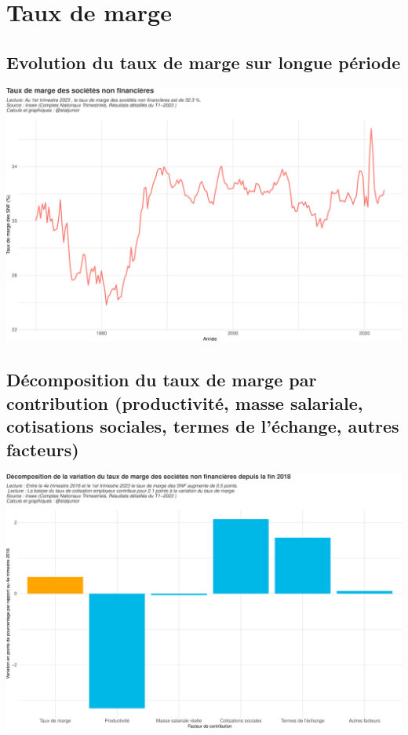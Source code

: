 \documentclass[
  paper=a4,
  ,captions=tableheading
]{scrartcl}
\begin{document}
\newpage

\hypertarget{taux-de-marge}{%
\section{Taux de marge}\label{taux-de-marge}}

\hypertarget{evolution-du-taux-de-marge-sur-longue-puxe9riode}{%
\subsection{Evolution du taux de marge sur longue
période}\label{evolution-du-taux-de-marge-sur-longue-puxe9riode}}

\includegraphics{rapport_pdf_compte_branche_files/figure-latex/unnamed-chunk-26-1.pdf}

\hypertarget{duxe9composition-du-taux-de-marge-par-contribution-productivituxe9-masse-salariale-cotisations-sociales-termes-de-luxe9change-autres-facteurs}{%
\subsection{Décomposition du taux de marge par contribution
(productivité, masse salariale, cotisations sociales, termes de
l'échange, autres
facteurs)}\label{duxe9composition-du-taux-de-marge-par-contribution-productivituxe9-masse-salariale-cotisations-sociales-termes-de-luxe9change-autres-facteurs}}

\includegraphics{rapport_pdf_compte_branche_files/figure-latex/unnamed-chunk-27-1.pdf}
\end{document}
